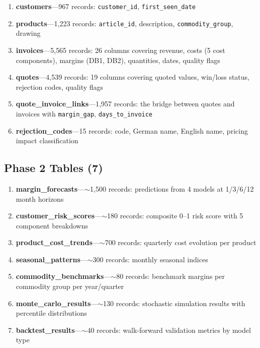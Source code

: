 \documentclass[11pt,a4paper]{article}
\newcommand{\code}[1]{\texttt{#1}}
\begin{document}
\begin{enumerate}[nosep]
  \item \textbf{customers}---967 records: \code{customer\_id}, \code{first\_seen\_date}
  \item \textbf{products}---1{,}223 records: \code{article\_id}, description, \code{commodity\_group}, drawing
  \item \textbf{invoices}---5{,}565 records: 26 columns covering revenue, costs (5 cost components), margins (DB1, DB2), quantities, dates, quality flags
  \item \textbf{quotes}---4{,}539 records: 19 columns covering quoted values, win/loss status, rejection codes, quality flags
  \item \textbf{quote\_invoice\_links}---1{,}957 records: the bridge between quotes and invoices with \code{margin\_gap}, \code{days\_to\_invoice}
  \item \textbf{rejection\_codes}---15 records: code, German name, English name, pricing impact classification
\end{enumerate}

\subsection{Phase 2 Tables (7)}

\begin{enumerate}[nosep,start=7]
  \item \textbf{margin\_forecasts}---$\sim$1{,}500 records: predictions from 4 models at 1/3/6/12 month horizons
  \item \textbf{customer\_risk\_scores}---$\sim$180 records: composite 0--1 risk score with 5 component breakdowns
  \item \textbf{product\_cost\_trends}---$\sim$700 records: quarterly cost evolution per product
  \item \textbf{seasonal\_patterns}---$\sim$300 records: monthly seasonal indices
  \item \textbf{commodity\_benchmarks}---$\sim$80 records: benchmark margins per commodity group per year/quarter
  \item \textbf{monte\_carlo\_results}---$\sim$130 records: stochastic simulation results with percentile distributions
  \item \textbf{backtest\_results}---$\sim$40 records: walk-forward validation metrics by model type
\end{enumerate}

\end{document}
